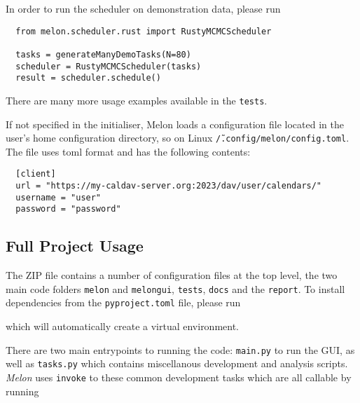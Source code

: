 In order to run the scheduler on demonstration data, please run
\begin{verbatim}
  from melon.scheduler.rust import RustyMCMCScheduler

  tasks = generateManyDemoTasks(N=80)
  scheduler = RustyMCMCScheduler(tasks)
  result = scheduler.schedule()
\end{verbatim}

There are many more usage examples available in the \texttt{tests}.

If not specified in the initialiser, Melon loads a configuration file located in the user's home configuration directory, so on Linux \texttt{\~/.config/melon/config.toml}.
The file uses \gls{toml} format and has the following contents:
\begin{verbatim}
  [client]
  url = "https://my-caldav-server.org:2023/dav/user/calendars/"
  username = "user"
  password = "password"
\end{verbatim}

\pagebreak
\subsection{Full Project Usage}
The ZIP file contains a number of configuration files at the top level, the two main code folders \texttt{melon} and \texttt{melongui}, \texttt{tests}, \texttt{docs} and the \texttt{report}.
To install dependencies from the \texttt{pyproject.toml} file, please run


which will automatically create a virtual environment.

There are two main entrypoints to running the code: \texttt{main.py} to run the GUI, as well as \texttt{tasks.py} which contains miscellanous development and analysis scripts. \textit{Melon} uses \texttt{invoke} to these common development tasks which are all callable by running


